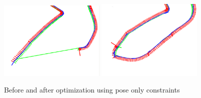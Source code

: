 \begin{figure}[H]
  \centering
    \includegraphics[width=0.45\textwidth]{chapters/images/before_opt_good}
    \includegraphics[width=0.45\textwidth]{chapters/images/after_opt_good}
  \caption{Before and after optimization using pose only constraints}
  \label{fig:graph_fail}
\end{figure}